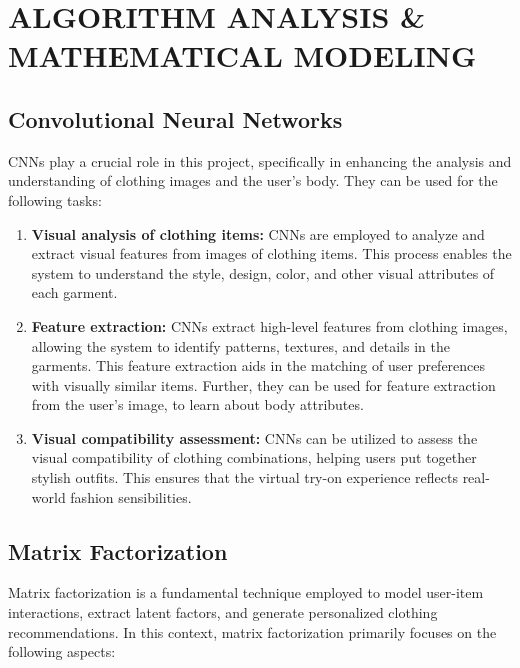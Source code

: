 \chapter{ALGORITHM ANALYSIS \& MATHEMATICAL MODELING}

\section{Convolutional Neural Networks}
	CNNs play a crucial role in this project, specifically in enhancing the analysis and understanding of clothing images and the user's body. They can be used for the following tasks:

	\begin{enumerate}
		\item \textbf{Visual analysis of clothing items:} CNNs are employed to analyze and extract visual features from images of clothing items. This process enables the system to understand the style, design, color, and other visual attributes of each garment.
		\item \textbf{Feature extraction:} CNNs extract high-level features from clothing images, allowing the system to identify patterns, textures, and details in the garments. This feature extraction aids in the matching of user preferences with visually similar items. Further, they can be used for feature extraction from the user's image, to learn about body attributes.
		\item \textbf{Visual compatibility assessment:} CNNs can be utilized to assess the visual compatibility of clothing combinations, helping users put together stylish outfits. This ensures that the virtual try-on experience reflects real-world fashion sensibilities.
	\end{enumerate}

\section{Matrix Factorization}
	Matrix factorization is a fundamental technique employed to model user-item interactions, extract latent factors, and generate personalized clothing recommendations. In this context, matrix factorization primarily focuses on the following aspects:

